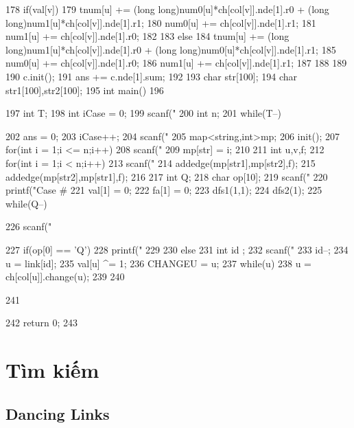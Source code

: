 \documentclass[11pt]{article}
\begin{document}
\begin{Code}
{{{178                  if(val[v]){
179                      tnum[u] += (long long)num0[u]*ch[col[v]].nde[1].r0
                            + (long long)num1[u]*ch[col[v]].nde[1].r1;
180                      num0[u] += ch[col[v]].nde[1].r1;
181                      num1[u] += ch[col[v]].nde[1].r0;
182                  }
183                  else {
184                      tnum[u] += (long long)num1[u]*ch[col[v]].nde[1].r0
                            + (long long)num0[u]*ch[col[v]].nde[1].r1;
185                      num0[u] += ch[col[v]].nde[1].r0;
186                      num1[u] += ch[col[v]].nde[1].r1;
187                  }
188              }
189       }
190       c.init();
191       ans += c.nde[1].sum;
192   }
193   char str[100];
194   char str1[100],str2[100];
195   int main()
196   {
197       int T;
198       int iCase = 0;
199       scanf("%
200       int n;
201       while(T--){
202           ans = 0;
203           iCase++;
204           scanf("%
205           map<string,int>mp;
206           init();
207           for(int i = 1;i <= n;i++){
208               scanf("%
209               mp[str] = i;
210           }
211           int u,v,f;
212           for(int i = 1;i < n;i++){
213               scanf("%
214               addedge(mp[str1],mp[str2],f);
215               addedge(mp[str2],mp[str1],f);
216           }
217           int Q;
218           char op[10];
219           scanf("%
220           printf("Case #%
221           val[1] = 0;
222           fa[1] = 0;
223           dfs1(1,1);
224           dfs2(1);
225           while(Q--){
226               scanf("%


227             if(op[0] == 'Q'){
228                 printf("%
229             }
230             else {
231                 int id ;
232                 scanf("%
233                 id--;
234                 u = link[id];
235                 val[u] ^= 1;
236                 CHANGEU = u;
237                 while(u)
238                     u = ch[col[u]].change(u);
239             }
240         }
241     }
242     return 0;
243 }
\end{Code}

\section{Tìm kiếm}

\subsection{Dancing Links}
\end{document}
